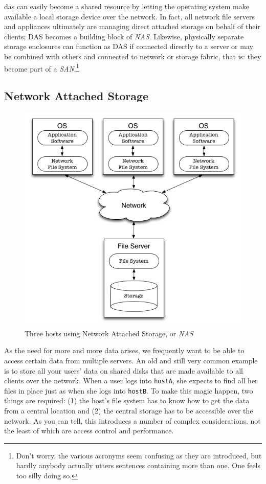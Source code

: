 \gls{das} can easily become a shared resource by
letting the operating system make available a local
storage device over the network.  In fact, all network
file servers and appliances ultimately are managing
direct attached storage on behalf of their clients;
DAS becomes a building block of {\em NAS}.  Likewise,
physically separate storage enclosures can function as
DAS if connected directly to a server or may be
combined with others and connected to network or
storage fabric, that is: they become part of a {\em
SAN}.\footnote{Don't worry, the various acronyms seem
confusing as they are introduced, but hardly anybody
actually utters sentences containing more than one.
One feels too silly doing so.}


\subsection{Network Attached Storage}
\label{file systems:storage-models:nas}

\begin{figure}[ht]
	\centering
	\includegraphics[width=.66\textwidth]{04/pics/nas}
		\caption{Three hosts using Network Attached Storage, or {\em NAS}
			\label{fig:storage:nas}}
\end{figure}


As the need for more and more data arises, we
frequently want to be able to access certain data from
multiple servers.  An old and still very common
example is to store all your users' data on shared
disks that are made available to all clients over the
network.  When a user logs into {\tt hostA}, she
expects to find all her files in place just as when
she logs into {\tt hostB}.  To make this magic happen,
two things are required: (1) the host's file system
has to know how to get the data from a central
location and (2) the central storage has to be
accessible over the network.  As you can tell, this
introduces a number of complex considerations, not the
least of which are access control and performance.

